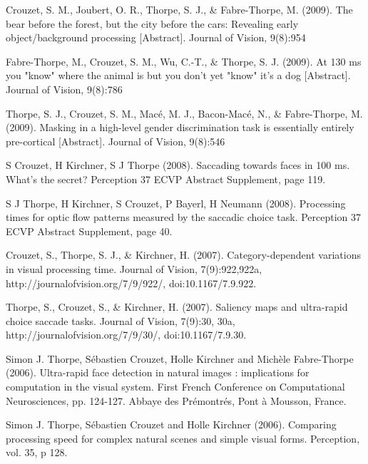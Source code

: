 \documentclass[margin,line]{resume}
\begin{document}
\begin{resume}
\vspace{-2mm} Crouzet, S. M., Joubert, O. R., Thorpe, S. J., \& Fabre-Thorpe, M. (2009). The bear before the forest, but the city before the cars: Revealing early object/background processing [Abstract]. Journal of Vision, 9(8):954

\vspace{-2mm} Fabre-Thorpe, M., Crouzet, S. M., Wu, C.-T., \& Thorpe, S. J. (2009). At 130 ms you "know" where the animal is but you don't yet "know" it's a dog [Abstract]. Journal of Vision, 9(8):786

\vspace{-2mm} Thorpe, S. J., Crouzet, S. M., Macé, M. J., Bacon-Macé, N., \& Fabre-Thorpe, M. (2009). Masking in a high-level gender discrimination task is essentially entirely pre-cortical [Abstract]. Journal of Vision, 9(8):546

\vspace{-2mm} S Crouzet, H Kirchner, S J Thorpe (2008). Saccading towards faces in 100 ms. What's the secret? Perception 37 ECVP Abstract Supplement, page 119. 

\vspace{-2mm} S J Thorpe, H Kirchner, S Crouzet, P Bayerl, H Neumann (2008). Processing times for optic flow patterns measured by the saccadic choice task. Perception 37 ECVP Abstract Supplement, page 40.

\vspace{-2mm} Crouzet, S., Thorpe, S. J., \& Kirchner, H. (2007). Category-dependent variations in visual processing time. Journal of Vision, 7(9):922,922a, http://journalofvision.org/7/9/922/, doi:10.1167/7.9.922.

\vspace{-2mm} Thorpe, S., Crouzet, S., \& Kirchner, H. (2007). Saliency maps and ultra-rapid choice saccade tasks. Journal of Vision, 7(9):30, 30a, http://journalofvision.org/7/9/30/, doi:10.1167/7.9.30.

\vspace{-2mm} Simon J. Thorpe, Sébastien Crouzet, Holle Kirchner and Michèle Fabre-Thorpe (2006). Ultra-rapid face detection in natural images : implications for computation in the visual system. First French Conference on Computational Neurosciences, pp. 124-127. Abbaye des Prémontrés, Pont à Mousson, France.

\vspace{-2mm} Simon J. Thorpe, Sébastien Crouzet and Holle Kirchner (2006). Comparing processing speed for complex natural scenes and simple visual forms. Perception, vol. 35, p 128.


\end{resume}
\end{document}

